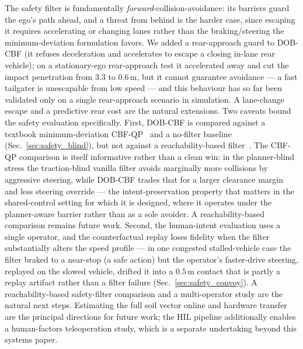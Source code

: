 \documentclass[conference,letterpaper,10pt]{IEEEtran}
\begin{document}
The safety filter is fundamentally \emph{forward}-collision-avoidance: its
barriers guard the ego's path ahead, and a threat from behind is the harder
case, since escaping it requires accelerating or changing lanes rather than
the braking/steering the minimum-deviation formulation favors. We added a
rear-approach guard to DOB-CBF (it refuses deceleration and accelerates to
escape a closing in-lane rear vehicle); on a stationary-ego rear-approach test
it accelerated away and cut the impact penetration from $3.3$ to $0.6\,$m, but
it cannot guarantee avoidance --- a fast tailgater is unescapable from low
speed --- and this behaviour has so far been validated only on a single
rear-approach scenario in simulation. A lane-change escape and a predictive
rear cost are the natural extensions.
Two caveats bound the safety evaluation specifically. First, DOB-CBF is
compared against a textbook minimum-deviation CBF-QP~\cite{Ames19} and a
no-filter baseline (Sec.~\ref{sec:safety_blind}), but not against a
reachability-based filter~\cite{Bansal17}. The CBF-QP comparison is itself
informative rather than a clean win: in the planner-blind stress the
traction-blind vanilla filter avoids marginally more collisions by aggressive
steering, while DOB-CBF trades that for a larger clearance margin and less
steering override --- the intent-preservation property that matters in the
shared-control setting for which it is designed, where it operates under the
planner-aware barrier rather than as a sole avoider. A reachability-based
comparison remains future work.
Second, the human-intent evaluation uses a single operator, and the
counterfactual replay loses fidelity when the filter substantially alters the
speed profile --- in one congested stalled-vehicle case the filter braked to a
near-stop (a safe action) but the operator's faster-drive steering, replayed
on the slowed vehicle, drifted it into a $0.5\,$m contact that is partly a
replay artifact rather than a filter failure (Sec.~\ref{sec:safety_convoy}). A
reachability-based safety-filter comparison and a multi-operator study are the
natural next steps.
Estimating the full soil vector online and hardware transfer are the
principal directions for future work; the HIL pipeline additionally enables
a human-factors teleoperation study, which is a separate undertaking beyond
this systems paper.

\end{document}
